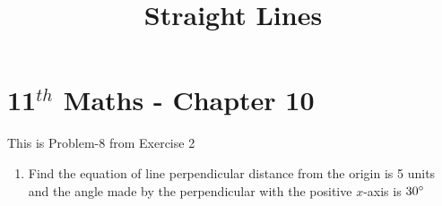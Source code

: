 \documentclass[12pt]{article}
\begin{document}
\begin{center}
\enlargethispage{-4cm}
\title{\textbf{Straight Lines}}
\date{\vspace{-5ex}} %
\maketitle
\end{center}
\setcounter{page}{1}
\section*{11$^{th}$ Maths - Chapter 10}
This is Problem-8 from Exercise 2
\begin{enumerate}
\item Find the equation of line perpendicular distance from the origin is 5 units and the angle made by the perpendicular with the positive $x$-axis is $30\degree$


\end{enumerate}
\end{document}
